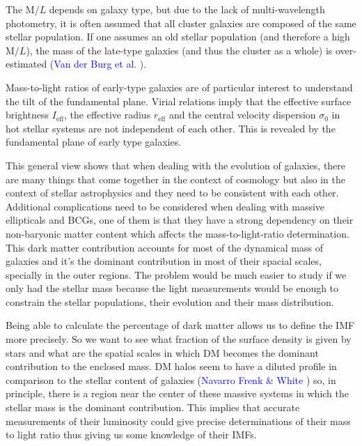 The $\text{M}/L$ depends on galaxy type, but due to the lack of multi-wavelength photometry, it is often assumed that all cluster galaxies are composed of the same stellar population. If one assumes an old stellar population (and therefore a high $\text{M}/L$), the mass of the late-type galaxies (and thus the cluster as a whole) is over-estimated (\textcolor{blue}{Van der Burg et al.} \citeyear{Reference2}).

Mass-to-light ratios of early-type galaxies are of particular interest to understand the tilt of the fundamental plane. Virial relations imply that the effective surface brightness $I_{\text{eff}}$, the effective radius $r_{\text{eff}}$ and the central velocity dispersion $\sigma_{0}$ in hot stellar systems are not independent of each other. This is revealed by the fundamental plane of early type galaxies.

This general view shows that when dealing with the evolution of galaxies, there are many things that come together in the context of cosmology but also in the context of stellar astrophysics and they need to be consistent with each other. Additional complications need to be considered when dealing with massive ellipticals and BCGs, one of them is that they have a strong dependency on their non-baryonic matter content which affects the mass-to-light-ratio determination. This dark matter contribution accounts for most of the dynamical mass of galaxies and it's the dominant contribution in most of their spacial scales, specially in the outer regions. The problem would be much easier to study if we only had the stellar mass because the light measurements would be enough to constrain the stellar populations, their evolution and their mass distribution. 

Being able to calculate the percentage of dark matter allows us to define the IMF more precisely. So we want to see what fraction of the surface density is given by stars and what are the spatial scales in which DM becomes the dominant contribution to the enclosed mass. DM halos seem to have a diluted profile in comparison to the stellar content of galaxies (\textcolor{blue}{Navarro Frenk \& White} \citeyear{Reference17}) so, in principle, there is a region near the center of these massive systems in which the stellar mass is the dominant contribution. This implies that accurate measurements of their luminosity could give precise determinations of their mass to light ratio thus giving us some knowledge of their IMFs.

